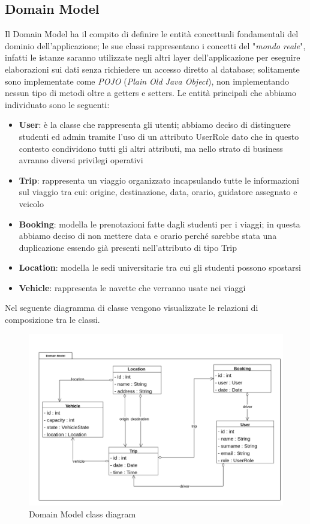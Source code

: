\subsection{Domain Model}\label{subsec:DM}
Il Domain Model ha il compito di definire le entità concettuali fondamentali del dominio dell'applicazione; le sue classi rappresentano i concetti del "\textit{mondo reale}", infatti le istanze saranno utilizzate negli altri layer dell'applicazione per eseguire elaborazioni sui dati senza richiedere un accesso diretto al database; solitamente sono implementate come \textit{POJO} (\textit{Plain Old Java Object}), non implementando nessun tipo di metodi oltre a getters e setters.
Le entità principali che abbiamo individuato sono le seguenti:
\begin{itemize}
    \item \textbf{User}: è la classe che rappresenta gli utenti; abbiamo deciso di distinguere studenti ed admin tramite l'uso di un attributo UserRole dato che in questo contesto condividono  tutti gli altri attributi, ma nello strato di business avranno diversi privilegi operativi
    \item \textbf{Trip}: rappresenta un viaggio organizzato incapsulando tutte le informazioni sul viaggio tra cui: origine, destinazione, data, orario, guidatore assegnato e veicolo
    \item \textbf{Booking}: modella le prenotazioni fatte dagli studenti per i viaggi; in questa abbiamo deciso di non mettere data e orario perché sarebbe stata una duplicazione essendo già presenti nell'attributo di tipo Trip
    \item \textbf{Location}: modella le sedi universitarie tra cui gli studenti possono spostarsi
    \item \textbf{Vehicle}: rappresenta le navette che verranno usate nei viaggi
\end{itemize}
Nel seguente diagramma di classe vengono visualizzate le relazioni di composizione tra le classi.
\begin{figure}[H]
    \centering
    \includegraphics[width=1.2\linewidth]{Images/DomainModel_diag.png}
    \caption{Domain Model class diagram}
    \label{fig:DMdiag}
\end{figure}
